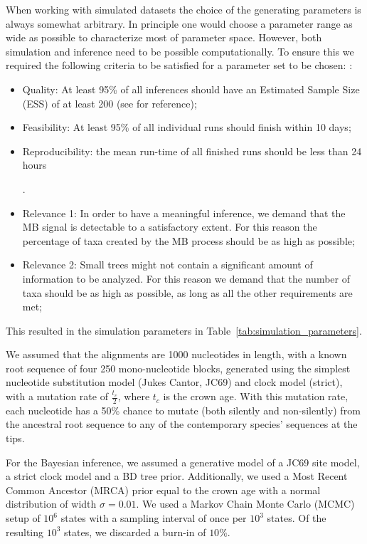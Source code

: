 When working with simulated datasets the choice of the generating parameters is always somewhat arbitrary. In principle one would choose a parameter range as wide as possible to characterize most of parameter space. However, both simulation and inference need to be possible computationally. To ensure this
we required the following criteria to be satisfied for a parameter set to be chosen: :
\begin{itemize}
  \item Quality: At least 95\% of all inferences should have an Estimated Sample Size (ESS) of at least 200 (see \cite{beast} for reference);
  \item Feasibility: At least 95\% of all individual runs should finish within 10 days;
  \item Reproducibility: the mean run-time of all finished runs should be less than 24 hours 
    
    . 
  \item Relevance 1: In order to have a meaningful inference, we demand that the MB signal is detectable to a satisfactory extent. For this reason the percentage of taxa created by the MB process should be as high as possible;
  \item Relevance 2: Small trees might not contain a significant amount of information to be analyzed. For this reason we demand that the number of taxa should be as high as possible, as long as all the other requirements are met;
\end{itemize}

This resulted in the simulation parameters in Table~\ref{tab:simulation_parameters}.



We assumed that the alignments are 1000 nucleotides in length, with a known root sequence of four 250 mono-nucleotide blocks, generated using the simplest nucleotide substitution model (Jukes Cantor, JC69) and clock model (strict), with a mutation rate of $\frac{t_c}{2}$, where $t_c$ is the crown age. 
With this mutation rate, each nucleotide has a 50\% chance to mutate (both silently and non-silently) from the ancestral root sequence to any of the contemporary species' sequences at the tips.

For the Bayesian inference, we assumed a generative model of a JC69 site model, a strict clock model and a BD tree prior.
Additionally, we used a Most Recent Common Ancestor (MRCA) prior equal to the crown age with a normal distribution of width $\sigma = 0.01$. We used a Markov Chain Monte Carlo (MCMC) setup of $10^6$ states with a sampling interval of once per $10^3$ states. Of the resulting $10^3$ states, we discarded a burn-in of $10\%$.

